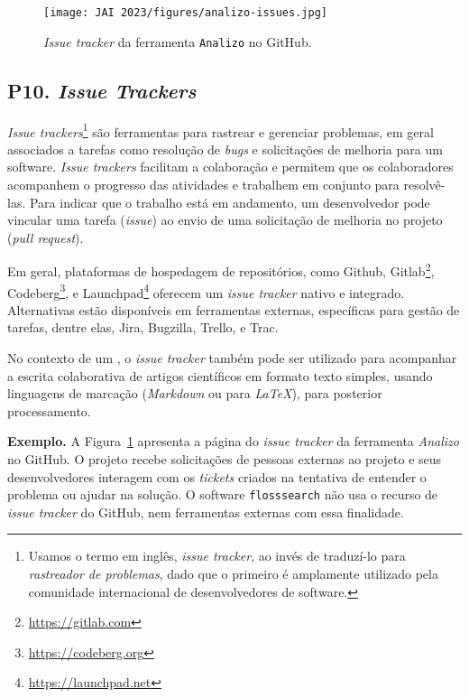 \begin{figure}[tbp]
    \centering
    \texttt{[image: JAI 2023/figures/analizo-issues.jpg]}
    \caption{\textit{Issue tracker} da ferramenta \texttt{Analizo} no GitHub.}
    \label{fig:issuetracker:analizo}
\end{figure}

\subsection*{P10. \textit{Issue Trackers} } 

\textit{Issue trackers}\footnote{Usamos o termo em inglês, \textit{issue tracker}, ao invés de traduzí-lo para \textit{rastreador de problemas}, dado que o primeiro é amplamente utilizado pela comunidade internacional de desenvolvedores de software.} 
são ferramentas para rastrear e gerenciar problemas, em geral associados a tarefas como resolução de \textit{bugs} e solicitações de melhoria para um software. 
\textit{Issue trackers} facilitam a colaboração e permitem que os colaboradores acompanhem o progresso das atividades e trabalhem em conjunto para resolvê-las.
Para indicar que o trabalho está em andamento, um desenvolvedor pode vincular uma tarefa (\textit{issue}) 
ao envio de uma solicitação de melhoria no projeto (\textit{pull request}).

Em geral, plataformas de hospedagem de repositórios, como Github, Gitlab\footnote{\url{https://gitlab.com}}, Codeberg\footnote{\url{https://codeberg.org}}, e Launchpad\footnote{\url{https://launchpad.net}} oferecem um \textit{issue tracker} nativo e integrado. Alternativas estão disponíveis em ferramentas externas, específicas para gestão de tarefas, dentre elas, Jira, Bugzilla, Trello, e Trac.

No contexto de um \RS, o \textit{issue tracker} também pode ser utilizado para acompanhar a escrita colaborativa de artigos científicos em formato texto simples, usando  linguagens de marcação (\textit{Markdown} ou para \textit{LaTeX}), para posterior processamento.

\noindent \textbf{Exemplo.}
A Figura~\ref{fig:issuetracker:analizo} apresenta a página do \textit{issue tracker} da ferramenta \textit{Analizo} no GitHub. O projeto recebe solicitações de pessoas externas ao projeto e seus desenvolvedores interagem com os \textit{tickets} criados na tentativa de entender o problema ou ajudar na solução.
%
O software \texttt{flosssearch} não usa o recurso de \textit{issue tracker} do GitHub, nem ferramentas externas com essa finalidade.

